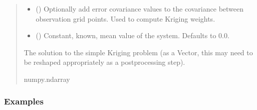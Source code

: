 \documentclass[letterpaper,10pt,english]{sphinxmanual}
\begin{document}
\begin{fulllineitems}
\begin{fulllineitems}
\begin{quote}
\begin{description}
\begin{itemize}
\item {}
\sphinxAtStartPar
{} (\sphinxstyleliteralemphasis{\sphinxupquote{ | }}) \textendash{} Optionally add error covariance values to the covariance between
observation grid points. Used to compute Kriging weights.

\item {}
\sphinxAtStartPar
{} (\sphinxstyleliteralemphasis{\sphinxupquote{ | }}) \textendash{} Constant, known, mean value of the system. Defaults to 0.0.

\end{itemize}

\sphinxAtStartPar
The solution to the simple Kriging problem (as a Vector, this may
need to be re\sphinxhyphen{}shaped appropriately as a post\sphinxhyphen{}processing step).

\sphinxAtStartPar
numpy.ndarray

\end{description}\end{quote}
\subsubsection*{Examples}

\begin{sphinxVerbatim}[commandchars=\\\{\}]
  
  
\end{sphinxVerbatim}

\end{fulllineitems}


\end{fulllineitems}

\end{document}
